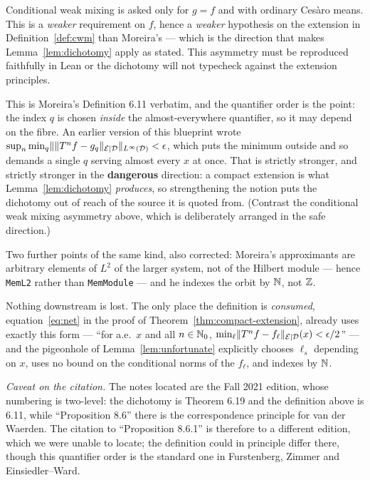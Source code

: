 \begin{remark}
  Conditional weak mixing is asked only for $g = f$ and with ordinary Ces\`aro means.  This is
  a \emph{weaker} requirement on $f$, hence a \emph{weaker} hypothesis on the extension in
  Definition~\ref{def:cwm} than Moreira's --- which is the direction that makes
  Lemma~\ref{lem:dichotomy} apply as stated.  This asymmetry must be reproduced faithfully in
  Lean or the dichotomy will not typecheck against the extension principles.
\end{remark}

\begin{remark}
  \label{rem:compact-mismatch}
  This is Moreira's Definition 6.11 verbatim, and the quantifier order is the point: the
  index $q$ is chosen \emph{inside} the almost-everywhere quantifier, so it may depend on the
  fibre.  An earlier version of this blueprint wrote
  $\sup_n \min_q \lVert \lVert T^nf - g_q \rVert_{\mathcal{E} \mid \mathcal{D}} \rVert_{L^\infty(\mathcal{D})} < \epsilon$, which puts the
  minimum outside and so demands a single $q$ serving almost every $x$ at once.  That is
  strictly stronger, and strictly stronger in the \textbf{dangerous} direction: a compact
  extension is what Lemma~\ref{lem:dichotomy} \emph{produces}, so strengthening the notion
  puts the dichotomy out of reach of the source it is quoted from.  (Contrast the conditional
  weak mixing asymmetry above, which is deliberately arranged in the safe direction.)

  Two further points of the same kind, also corrected: Moreira's approximants are arbitrary
  elements of $L^2$ of the larger system, not of the Hilbert module --- hence
  \texttt{MemL2} rather than \texttt{MemModule} --- and he indexes the orbit by $\mathbb{N}$, not
  $\mathbb{Z}$.

  Nothing downstream is lost.  The only place the definition is \emph{consumed},
  equation~\eqref{eq:net} in the proof of Theorem~\ref{thm:compact-extension}, already uses
  exactly this form --- ``for a.e.\ $x$ and all $n \in \mathbb{N}_0$, $\min_\ell \lVert T^nf-f_\ell \rVert_{\mathcal{E} \mid \mathcal{D}}(x)
  < \epsilon/2$'' --- and the pigeonhole of Lemma~\ref{lem:unfortunate} explicitly chooses
  $\ell_s$ depending on $x$, uses no bound on the conditional norms of the $f_\ell$, and
  indexes by $\mathbb{N}$.

  \emph{Caveat on the citation.}  The notes located are the Fall 2021 edition, whose numbering
  is two-level: the dichotomy is Theorem 6.19 and the definition above is 6.11, while
  ``Proposition 8.6'' there is the correspondence principle for van der Waerden.  The
  citation to ``Proposition 8.6.1'' is therefore to a different edition, which we were unable
  to locate; the definition could in principle differ there, though this quantifier order is
  the standard one in Furstenberg, Zimmer and Einsiedler--Ward.
\end{remark}

